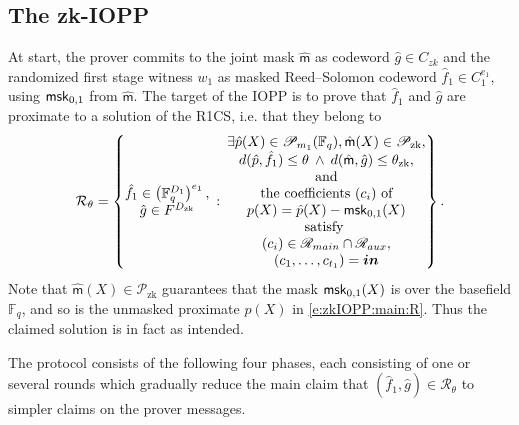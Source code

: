 \subsection{The zk-IOPP}

At start, the prover commits to the joint mask $\hat{\mathsf m}$ as codeword $\hat g \in C_{zk}$ and the randomized first stage witness $w_1$ as masked Reed--Solomon codeword $\hat f_1\in C_1^{e_1}$, using $\mathsf{msk}_{0,1}$ from $\hat{\mathsf m}$.
The target of the IOPP is to prove that $\hat f_1$ and $\hat g$ are proximate to a solution of the R1CS, i.e. that they belong to
\begin{equation}
\label{e:zkIOPP:main:R}
\mathcal R_\theta = \left\{
    \begin{matrix}
    \hat f_1\in \left(\mathbb F_q^{D_1}\right)^{e_1}, 
    \\
    \hat g\in F^{D_\text{zk}}
    \end{matrix}
    \::\:
    \begin{matrix}
    \exists 
    \hat p(X) \in \mathscr P_{m_1}(\mathbb F_q), 
    \hat{\mathsf m}(X) \in \mathscr P_\text{zk},
    \\
    d(\hat p, \hat f_1) \leq \theta \:\wedge\: d(\hat{\mathsf m},\hat g)\leq \theta_\text{zk},
    \\\text{and}
    \\
    \text{the coefficients $(c_i)$ of}
    \\
    p(X) = \hat p(X) - \msk_{0,1}(X)
    \\
    \text{satisfy 
    }
    \\
    (c_i)  \in \mathscr R_{main} \cap \mathscr R_{aux},
    \\
    (c_1,\ldots,c_{t_1}) = \vec{in}
    \end{matrix}
\right\}.
\end{equation}
Note that $\hat{\mathsf m}(X)\in\mathscr P_\text{zk}$ guarantees that the mask $\mathsf{msk}_{0,1}(X)$ is over the basefield $\mathbb F_q$, and so is the unmasked proximate $p(X)$ in \eqref{e:zkIOPP:main:R}.
Thus the claimed solution is in fact as intended.

The protocol consists of the following four phases, each consisting of one or several rounds which gradually reduce the main claim that $(\hat f_1, \hat g)\in \mathscr R_\theta$ to simpler claims on the prover messages. 

